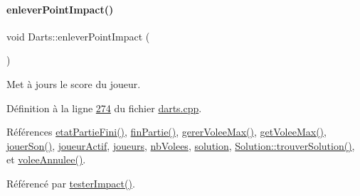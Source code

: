 \paragraph{\texorpdfstring{enlever\+Point\+Impact()}{enleverPointImpact()}}
{\footnotesize\ttfamily void Darts\+::enlever\+Point\+Impact (\begin{DoxyParamCaption}{ }\end{DoxyParamCaption})\hspace{0.3cm}{\ttfamily [private]}}



Met à jours le score du joueur. 



Définition à la ligne \hyperlink{darts_8cpp_source_l00274}{274} du fichier \hyperlink{darts_8cpp_source}{darts.\+cpp}.



Références \hyperlink{class_darts_a04a60e25e4c6a608a15c6abce35c9dfa}{etat\+Partie\+Fini()}, \hyperlink{class_darts_a751870924fe01a94fbf49ce45451a218}{fin\+Partie()}, \hyperlink{darts_8cpp_source_l00409}{gerer\+Volee\+Max()}, \hyperlink{darts_8cpp_source_l00066}{get\+Volee\+Max()}, \hyperlink{class_darts_a87995841c66fc321b63c28fa8a786347}{jouer\+Son()}, \hyperlink{darts_8h_source_l00076}{joueur\+Actif}, \hyperlink{darts_8h_source_l00073}{joueurs}, \hyperlink{darts_8h_source_l00080}{nb\+Volees}, \hyperlink{darts_8h_source_l00072}{solution}, \hyperlink{solution_8cpp_source_l00296}{Solution\+::trouver\+Solution()}, et \hyperlink{class_darts_a78f609ea9e8867459804bad777ce39f3}{volee\+Annulee()}.



Référencé par \hyperlink{darts_8cpp_source_l00246}{tester\+Impact()}.


